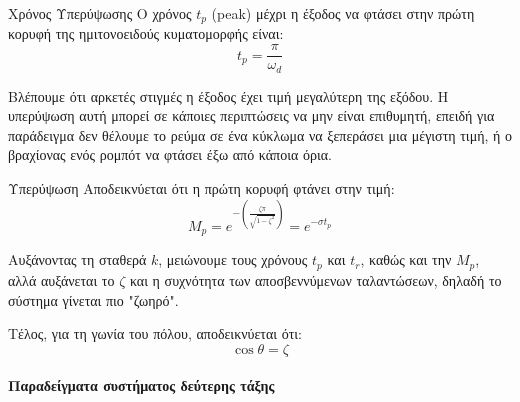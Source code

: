 \documentclass[11pt,a4paper,notitlepage,fleqn]{article}
\begin{document}
\begin{itemize}
	\begin{defn}{Χρόνος Υπερύψωσης}{}
	Ο χρόνος \( t_p \) (peak) μέχρι η έξοδος να φτάσει στην πρώτη κορυφή της ημιτονοειδούς κυματομορφής είναι:
	\[
	\boxed{t_p = \frac{π}{\omega_d}}
	\]
	\end{defn}
	
	Βλέπουμε ότι αρκετές στιγμές η έξοδος έχει τιμή μεγαλύτερη της εξόδου. Η υπερύψωση αυτή
	μπορεί σε κάποιες περιπτώσεις να μην είναι επιθυμητή, επειδή για παράδειγμα δεν θέλουμε
	το ρεύμα σε ένα κύκλωμα να ξεπεράσει μια μέγιστη τιμή, ή ο βραχίονας ενός ρομπότ να
	φτάσει έξω από κάποια όρια.
	
	\begin{defn}{Υπερύψωση}{}
		Αποδεικνύεται ότι η πρώτη κορυφή φτάνει στην τιμή:
		\[
		M_p =
		e^{-\left(
			\frac{ζπ}{\sqrt{1-ζ^2}}
			\right)}
		= e^{-σ t_p}
		\]
	\end{defn}
	
	Αυξάνοντας τη σταθερά \( k \), μειώνουμε τους χρόνους \( t_p \) και \( t_r \), καθώς και την \( M_p \),
	αλλά αυξάνεται το \( ζ \) και η συχνότητα των αποσβεννύμενων ταλαντώσεων, δηλαδή το σύστημα γίνεται πιο "ζωηρό".
	
	Τέλος, για τη γωνία του πόλου, αποδεικνύεται ότι:
	\[
	\boxed{\cos θ = ζ}
	\]
\end{itemize}
	
\paragraph{Παραδείγματα συστήματος δεύτερης τάξης} \hspace{0pt}
\end{document}
